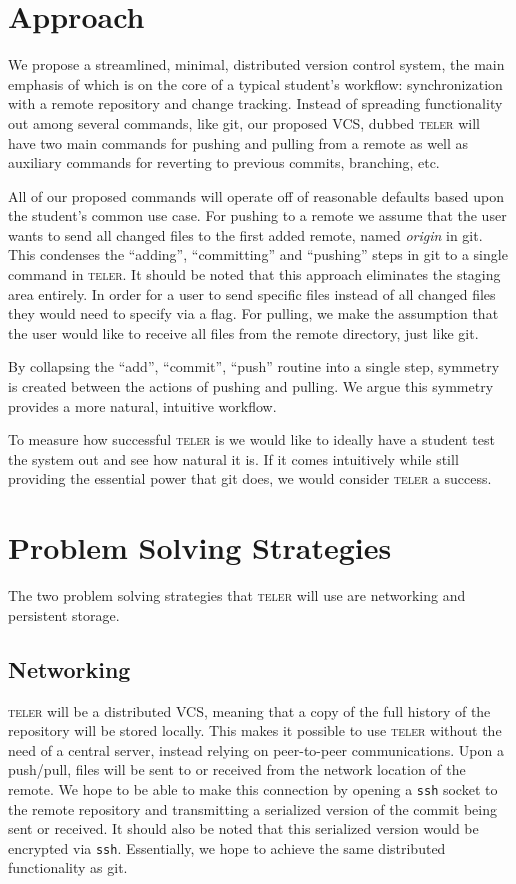 \documentclass[12pt, letterpaper]{article}
\begin{document}
\section{Approach}
\label{sec:approach}

We propose a streamlined, minimal, distributed version control system,
the main emphasis of which is on the core of a typical student's
workflow: synchronization with a remote repository and
change tracking. Instead of spreading functionality out among several
commands, like git, our proposed VCS, dubbed \textsc{teler} will have
two main commands for pushing and pulling from a remote as well as
auxiliary commands for reverting to previous commits, branching, etc.

All of our proposed commands will operate off of reasonable defaults
based upon the student's common use case. For pushing to a remote we
assume that the user wants to send all changed files to the first
added remote, named \textit{origin} in git. This condenses the
``adding'', ``committing'' and ``pushing'' steps in git to a single
command in \textsc{teler}. It should be noted that this approach
eliminates the staging area entirely. In order for a user to send
specific files instead of all changed files they would need to specify
via a flag. For pulling, we make the assumption that the user would
like to receive all files from the remote directory, just like git.

By collapsing the ``add'', ``commit'', ``push'' routine into a single
step, symmetry is created between the actions of pushing and pulling.
We argue this symmetry provides a more natural, intuitive workflow.

To measure how successful \textsc{teler} is we would like to ideally
have a student test the system out and see how natural it is. If it
comes intuitively while still providing the essential power that git
does, we would consider \textsc{teler} a success.

\section{Problem Solving Strategies}
\label{sec:strategies}

The two problem solving strategies that \textsc{teler} will use are
networking and persistent storage. 

\subsection{Networking}
\label{sec:networking}
\textsc{teler} will be a distributed VCS, meaning that a copy of the
full history of the repository will be stored locally. This makes it
possible to use \textsc{teler} without the need of a central server,
instead relying on peer-to-peer communications. Upon a push/pull, files
will be sent to or received from the network location of the remote.
We hope to be able to make this connection by opening a \texttt{ssh}
socket to the remote repository and transmitting a serialized version
of the commit being sent or received. It should also be noted that
this serialized version would be encrypted via \texttt{ssh}.
Essentially, we hope to achieve the same distributed functionality as
git.
\end{document}
